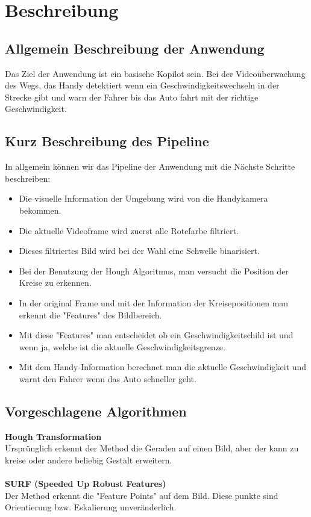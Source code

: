 \section*{Beschreibung}
\subsection*{Allgemein Beschreibung der Anwendung}
	Das Ziel der Anwendung ist ein basische Kopilot sein. Bei der Video\"uberwachung des Wegs, das Handy detektiert wenn ein Geschwindigkeitswechseln in der Strecke gibt und warn der Fahrer bis das Auto fahrt mit der richtige Geschwindigkeit.
\subsection*{Kurz Beschreibung des Pipeline}
	In allgemein k\"onnen wir das Pipeline der Anwendung mit die N\"achste Schritte beschreiben:
	\begin{itemize}
		\item Die visuelle Information der Umgebung wird von die Handykamera bekommen.
		\item Die aktuelle Videoframe wird zuerst alle Rotefarbe filtriert.
		\item Dieses filtriertes Bild wird bei der Wahl eine Schwelle binarisiert.
		\item Bei der Benutzung der Hough Algoritmus, man versucht die Position der Kreise zu erkennen.
		\item In der original Frame und mit der Information der Kreisepositionen man erkennt die "Features" des Bildbereich.
		\item Mit diese "Features" man entscheidet ob ein Geschwindigkeitschild ist und wenn ja, welche ist die aktuelle Geschwindigkeitsgrenze.
		\item Mit dem Handy-Information berechnet man die aktuelle Geschwindigkeit und warnt den Fahrer wenn das Auto schneller geht.
	\end{itemize}
\subsection*{Vorgeschlagene Algorithmen}
	\textbf{Hough Transformation}\\
	Urspr\"unglich erkennt der Method die Geraden auf einen Bild, aber der kann zu kreise  oder andere beliebig Gestalt erweitern.\\ \\
	
	\textbf{SURF (Speeded Up Robust Features)}\\
	Der Method erkennt die "Feature Points" auf dem Bild. Diese punkte sind Orientierung bzw. Eskalierung unver\"anderlich.\\ \\
	
